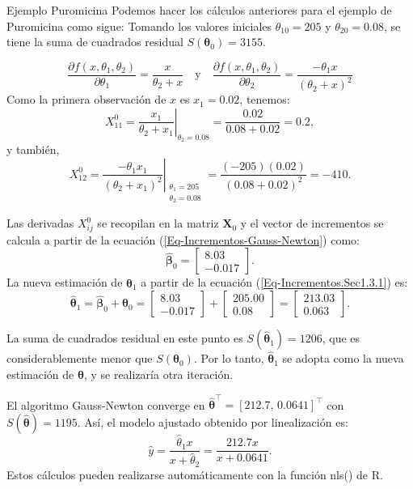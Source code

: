 \documentclass[aspectratio = 169, spanish]{beamer}
\begin{document}
\begin{frame}{Ejemplo Puromicina}
    Podemos hacer los cálculos anteriores para el ejemplo de Puromicina como sigue: Tomando los valores iniciales $\theta_{10} = 205$ y $\theta_{20} = 0.08$, se tiene la suma de cuadrados residual $S(\bm{\theta}_0) = 3155$.

    \[
    \frac{\partial f(x, \theta_1, \theta_2)}{\partial \theta_1} = \frac{x}{\theta_2 + x} \quad \text{y} \quad \frac{\partial f(x, \theta_1, \theta_2)}{\partial \theta_2} = \frac{-\theta_1 x}{\left(\theta_2 + x\right)^2}
    \]
    Como la primera observación de $x$ es $x_1 = 0.02$, tenemos:
    \[
    X_{11}^0 = \left. \frac{x_1}{\theta_2 + x_1} \right|_{\theta_2 = 0.08} = \frac{0.02}{0.08 + 0.02} = 0.2,
    \]
    y también,
    \[
    X_{12}^0 = \left. \frac{-\theta_1 x_1}{\left(\theta_2 + x_1\right)^2} \right|_{\substack{\theta_1 = 205 \\ \theta_2 = 0.08}} = \frac{(-205)(0.02)}{\left(0.08 + 0.02\right)^2} = -410.
    \]
\end{frame}

\begin{frame}
    Las derivadas $X_{ij}^0$ se recopilan en la matriz $\bm{X}_0$ y el vector de incrementos se calcula a partir de la ecuación (\ref{Eq-Incrementos-Gauss-Newton}) como:
\[
\hat{\bm{\beta}}_0 = \begin{bmatrix}
8.03 \\
-0.017
\end{bmatrix}.
\]
La nueva estimación de $\hat{\bm{\theta}}_1$ a partir de la ecuación (\ref{Eq-Incrementos.Sec1.3.1}) es:
\[
\hat{\bm{\theta}}_1 = \hat{\bm{\beta}}_0 + \bm{\theta}_0
=
\begin{bmatrix}
8.03 \\
-0.017
\end{bmatrix} +
\begin{bmatrix}
205.00 \\
0.08
\end{bmatrix}
=
\begin{bmatrix}
213.03 \\
0.063
\end{bmatrix}.
\]
\end{frame}

\begin{frame}
    La suma de cuadrados residual en este punto es $S(\hat{\bm{\theta}}_1) = 1206$, que es considerablemente menor que $S(\bm{\theta}_0)$. Por lo tanto, $\hat{\bm{\theta}}_1$ se adopta como la nueva estimación de $\bm{\theta}$, y se realizaría otra iteración.

El algoritmo Gauss-Newton converge en $\hat{\bm{\theta}}^\top = [212.7,\, 0.0641]^\top$ con $S(\hat{\bm{\theta}}) = 1195$. Así, el modelo ajustado obtenido por linealización es:
\[
\hat{y} = \frac{\hat{\theta}_1 x}{x + \hat{\theta}_2} = \frac{212.7 x}{x + 0.0641}.
\]
Estos cálculos pueden realizarse automáticamente con la función nls() de R.
\end{frame}
\end{document}
